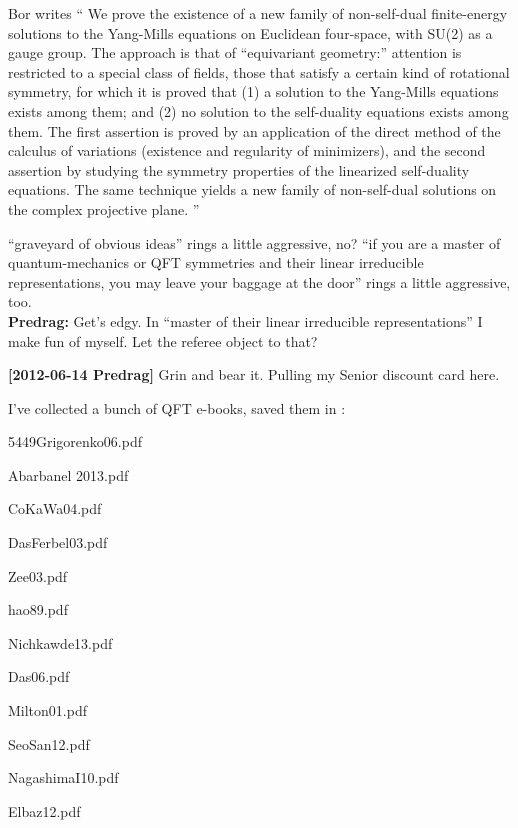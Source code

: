\begin{description}

Bor writes
``
We prove the existence of a new family of non-self-dual finite-energy
solutions to the Yang-Mills equations on Euclidean four-space, with SU(2)
as a gauge group. The approach is that of ``equivariant geometry:''
attention is restricted to a special class of fields, those that satisfy
a certain kind of rotational symmetry, for which it is proved that (1) a
solution to the Yang-Mills equations exists among them; and (2) no
solution to the self-duality equations exists among them. The first
assertion is proved by an application of the direct method of the
calculus of variations (existence and regularity of minimizers), and the
second assertion by studying the symmetry properties of the linearized
self-duality equations. The same technique yields a new family of
non-self-dual solutions on the complex projective plane.
''

\item[2012-04-19 Daniel] ``graveyard of obvious ideas'' rings a little
    aggressive, no? ``if you are a master of quantum-mechanics or QFT symmetries
and their linear irreducible representations, you may leave your
baggage at the door'' rings a little aggressive, too.
\\{\bf Predrag:} Get's edgy. In ``master of their linear irreducible
    representations'' I make fun of myself. Let the referee object to
    that?


{\bf [2012-06-14 Predrag]} Grin and bear it. Pulling my Senior discount
card here.

\item[2013-07-15 Predrag] I've collected a bunch of QFT e-books, saved
them in :

5449Grigorenko06.pdf

Abarbanel 2013.pdf

CoKaWa04.pdf

DasFerbel03.pdf

Zee03.pdf

hao89.pdf

Nichkawde13.pdf

Das06.pdf

Milton01.pdf

SeoSan12.pdf

NagashimaI10.pdf

Elbaz12.pdf


\end{description}
